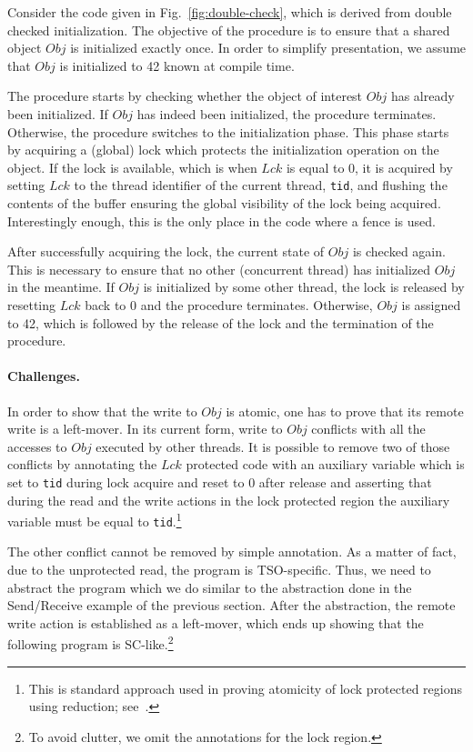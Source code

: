 Consider the code given in Fig.~\ref{fig:double-check}, which is derived from double checked initialization.
The objective of the procedure is to ensure that a shared object $Obj$ is initialized exactly once.
In order to simplify presentation, we assume that $Obj$ is initialized to 42 known at compile time.

The procedure starts by checking whether the object of interest $Obj$ has already been initialized.
If $Obj$ has indeed been initialized, the procedure terminates.
Otherwise, the procedure switches to the initialization phase.
This phase starts by acquiring a (global) lock which protects the initialization operation on the object.
If the lock is available, which is when $Lck$ is equal to 0, it is acquired by setting $Lck$ to the thread identifier of the current thread, {\tt tid}, and flushing the contents of the buffer ensuring the global visibility of the lock being acquired.
Interestingly enough, this is the only place in the code where a fence is used.

After successfully acquiring the lock, the current state of $Obj$ is checked again.
This is necessary to ensure that no other (concurrent thread) has initialized $Obj$ in the meantime.
If $Obj$ is initialized by some other thread, the lock is released by resetting $Lck$ back to 0 and the procedure terminates.
Otherwise, $Obj$ is assigned to 42, which is followed by the release of the lock and the termination of the procedure.

\paragraph{Challenges.}
In order to show that the write to $Obj$ is atomic, one has to prove that its remote write is a left-mover.
In its current form, write to $Obj$ conflicts with all the accesses to $Obj$ executed by other threads.
It is possible to remove two of those conflicts by annotating the $Lck$ protected code with an auxiliary variable which is set to {\tt tid} during lock acquire and reset to 0 after release and asserting that during the read and the write actions in the lock protected region the auxiliary variable must be equal to {\tt tid}.\footnote{This is standard approach used in proving atomicity of lock protected regions using reduction; see~\cite{EQT2009}.} 

The other conflict cannot be removed by simple annotation.
As a matter of fact, due to the unprotected read, the program is TSO-specific.
Thus, we need to abstract the program which we do similar to the abstraction done in the Send/Receive example of the previous section.
After the abstraction, the remote write action is established as a left-mover, which ends up showing that the following program is SC-like.\footnote{To avoid clutter, we omit the annotations for the lock region.}

